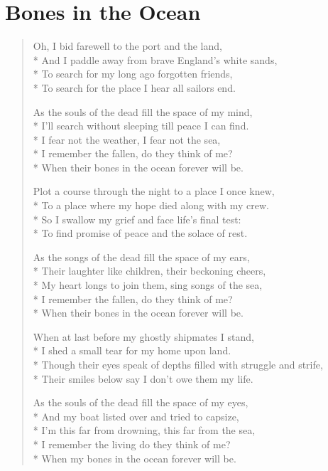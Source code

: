 \documentclass[9pt,twoside]{extarticle}
\newenvironment{xverse}{
	\begin{verse}
	\fontsize{8.5}{10.5}\selectfont
}{
	\end{verse}
}
\begin{document}
\section{Bones in the Ocean}
\begin{xverse}
Oh, I bid farewell to the port and the land, \\*
And I paddle away from brave England’s white sands, \\*
To search for my long ago forgotten friends, \\*
To search for the place I hear all sailors end.

As the souls of the dead fill the space of my mind, \\*
I’ll search without sleeping till peace I can find. \\*
I fear not the weather, I fear not the sea, \\*
I remember the fallen, do they think of me? \\*
When their bones in the ocean forever will be.

Plot a course through the night to a place I once knew, \\*
To a place where my hope died along with my crew. \\*
So I swallow my grief and face life’s final test: \\*
To find promise of peace and the solace of rest.

As the songs of the dead fill the space of my ears, \\*
Their laughter like children, their beckoning cheers, \\*
My heart longs to join them, sing songs of the sea, \\*
I remember the fallen, do they think of me? \\*
When their bones in the ocean forever will be.

When at last before my ghostly shipmates I stand, \\*
I shed a small tear for my home upon land. \\*
Though their eyes speak of depths filled with struggle and strife, \\*
Their smiles below say I don’t owe them my life.

As the souls of the dead fill the space of my eyes, \\*
And my boat listed over and tried to capsize, \\*
I’m this far from drowning, this far from the sea, \\*
I remember the living do they think of me? \\*
When my bones in the ocean forever will be.


\end{xverse}
\end{document}
